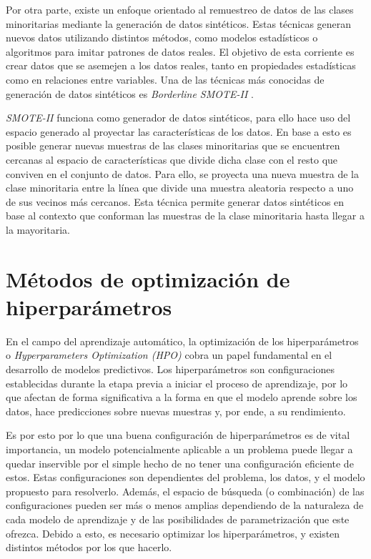 \documentclass{uathesis-es}
\begin{document}
	Por otra parte, existe un enfoque orientado al remuestreo de datos de las clases minoritarias mediante la generación de datos sintéticos. Estas técnicas generan nuevos datos utilizando distintos métodos, como modelos estadísticos o algoritmos para imitar patrones de datos reales. El objetivo de esta corriente es crear datos que se asemejen a los datos reales, tanto en propiedades estadísticas como en relaciones entre variables. Una de las técnicas más conocidas de generación de datos sintéticos es \textit{Borderline SMOTE-II} \cite{han2005borderline}.
	
	\textit{SMOTE-II} funciona como generador de datos sintéticos, para ello hace uso del espacio generado al proyectar las características de los datos. En base a esto es posible generar nuevas muestras de las clases minoritarias que se encuentren cercanas al espacio de características que divide dicha clase con el resto que conviven en el conjunto de datos. Para ello, se proyecta una nueva muestra de la clase minoritaria entre la línea que divide una muestra aleatoria respecto a uno de sus vecinos más cercanos. Esta técnica permite generar datos sintéticos en base al contexto que conforman las muestras de la clase minoritaria hasta llegar a la mayoritaria.
	
	\section{Métodos de optimización de hiperparámetros}
	\label{HYPERPARAMETERS_OPTIMIZATION_METHODS}
	
	En el campo del aprendizaje automático, la optimización de los hiperparámetros o \textit{Hyperparameters Optimization (HPO)} cobra un papel fundamental en el desarrollo de modelos predictivos. Los hiperparámetros son configuraciones establecidas durante la etapa previa a iniciar el proceso de aprendizaje, por lo que afectan de forma significativa a la forma en que el modelo aprende sobre los datos, hace predicciones sobre nuevas muestras y, por ende, a su rendimiento.
	
	Es por esto por lo que una buena configuración de hiperparámetros es de vital importancia, un modelo potencialmente aplicable a un problema puede llegar a quedar inservible por el simple hecho de no tener una configuración eficiente de estos. Estas configuraciones son dependientes del problema, los datos, y el modelo propuesto para resolverlo. Además, el espacio de búsqueda (o combinación) de las configuraciones pueden ser más o menos amplias dependiendo de la naturaleza de cada modelo de aprendizaje y de las posibilidades de parametrización que este ofrezca. Debido a esto, es necesario optimizar los hiperparámetros, y existen distintos métodos por los que hacerlo.
	
\end{document}
